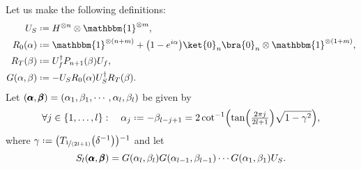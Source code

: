\documentclass[reqno,oneside,12pt]{amsart}  %
\numberwithin{equation}{section}                %
\let\originalleft\left
\let\originalright\right
\renewcommand{\left}{\mathopen{}\mathclose\bgroup\originalleft}
\renewcommand{\right}{\aftergroup\egroup\originalright}
\def\({\mathopen{}\left(}
\def\){\right)\mathclose{}}
\newcommand*{\eqdef}{\mathrel{\vcenter{\baselineskip0.5ex \lineskiplimit0pt\hbox{.}\hbox{.}}}=}
\def\id{\mathbbm{1}}
\begin{document}
Let us make the following definitions:
\begin{align}
   U_S                     &\eqdef H^{\otimes n} \otimes \id^{\otimes m}, \\
   R_0 \( \alpha \)        &\eqdef \id^{\otimes (n + m)} + \( 1 - e^{i \alpha} \) \ket{0}_n \bra{0}_n \otimes \id^{\otimes (1 + m)}, \\
   R_T \( \beta \)         &\eqdef U_f^\dagger P_{n + 1} \( \beta \) U_f, \\
   G \( \alpha, \beta \)   &\eqdef - U_S R_0 \( \alpha \) U_S^\dagger R_T \( \beta \).
\end{align}
Let $\( \pmb{\alpha}, \pmb{\beta} \) = \( \alpha_1, \beta_1, \cdots, \alpha_l, \beta_l \)$ be given by
\begin{equation}
   \forall j \in \{ 1, \ldots, l \}: \quad \alpha_j \eqdef - \beta_{l - j + 1} = 2 \cot^{- 1} \( \tan \( \tfrac{2 \pi j}{2 l + 1} \) \sqrt{1 - \gamma^2} \),
\end{equation}
where $\gamma \eqdef \( T_{\nicefrac{1}{\( 2 l + 1\)}} \( \delta^{- 1} \) \)^{- 1}$
and let
\begin{equation}
   S_l \( \pmb{\alpha}, \pmb{\beta} \) = G \( \alpha_l, \beta_l \) G \( \alpha_{l - 1}, \beta_{l - 1} \) \cdots G \( \alpha_1, \beta_1 \) U_S. \label{eq:S_l-def}
\end{equation}





   
\end{document}
